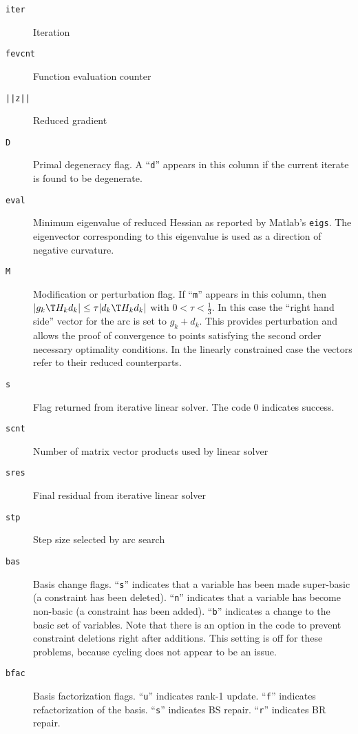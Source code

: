 \documentclass[11pt]{article}
\newcommand{\code}[1]{\texttt{#1}}
\begin{document}
\begin{description}
\item[\code{iter}] Iteration
\item[\code{fevcnt}] Function evaluation counter
\item[\code{||z||}] Reduced gradient
\item[\code{D}] Primal degeneracy flag.  A ``\code{d}'' appears in this column
  if the current iterate is found to be degenerate.
\item[\code{eval}] Minimum eigenvalue of reduced Hessian as reported by
  Matlab's \code{eigs}.  The eigenvector corresponding to this eigenvalue is
  used as a direction of negative curvature.
\item[\code{M}] Modification or perturbation flag.  If ``\code{m}'' appears in
  this column, then $|g_k\T H_k d_k| \le \tau |d_k\T H_k d_k|$ with $0 < \tau <
  \frac{1}{3}$.  In this case the ``right hand side'' vector for the arc is set
  to $g_k + d_k$.  This provides perturbation and allows the proof of
  convergence to points satisfying the second order necessary optimality
  conditions.  In the linearly constrained case the vectors refer to their reduced
  counterparts.
\item[\code{s}] Flag returned from iterative linear solver.  The code $0$
  indicates success.
\item[\code{scnt}] Number of matrix vector products used by linear solver
\item[\code{sres}] Final residual from iterative linear solver
\item[\code{stp}] Step size selected by arc search
\item[\code{bas}] Basis change flags.  ``\code{s}'' indicates that a variable
  has been made super-basic (a constraint has been deleted).  ``\code{n}''
  indicates that a variable has become non-basic (a constraint has been
  added).  ``\code{b}'' indicates a change to the basic set of variables.  Note
  that there is an option in the code to prevent constraint deletions right
  after additions.  This setting is off for these problems, because cycling
  does not appear to be an issue.
\item[\code{bfac}] Basis factorization flags.  ``\code{u}'' indicates rank-1
  update.  ``\code{f}'' indicates refactorization of the basis.  ``\code{s}''
  indicates BS repair.  ``\code{r}'' indicates BR repair.
\end{description}

{}

\end{document}
